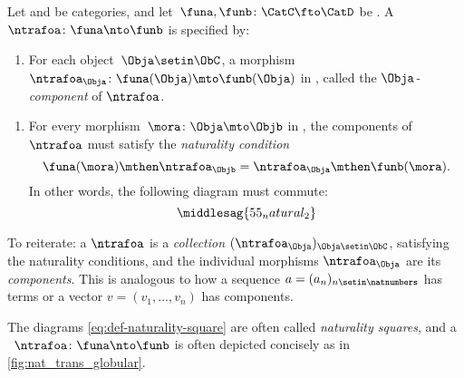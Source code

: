 \begin{ctdefinition}
    \label{def:natural-transformation}
    Let \CatC and \CatD be categories, and let~$\funa,\funb\colon \CatC\fto \CatD$ be .
    A ~$\ntrafoa \colon \funa \nto \funb$ is specified by:

    \constit
    \begin{enumerate}
        \item For each object~$\Obja\setin \ObC$, a morphism $\ntrafoa_\Obja \colon \funa(\Obja)\mto \funb(\Obja)$ in \CatD, called the $\Obja$\emph{-component} of $\ntrafoa$.
    \end{enumerate}
    \condit
    \begin{enumerate}
        \item For every morphism~$\mora\colon \Obja\mto \Objb$ in \CatC, the components of $\ntrafoa$ must satisfy the \emph{naturality condition}
              \begin{equation}
                  \funa(\mora)\mthen \ntrafoa_\Objb = \ntrafoa_\Obja\mthen \funb(\mora).
              \end{equation}
              In other words, the following diagram must commute:
              \begin{equation}
                  \label{eq:def-naturality-square}
                  \middlesag{55_natural_2}
              \end{equation}
    \end{enumerate}
\end{ctdefinition}

To reiterate: a  $\ntrafoa$ is a \emph{collection} $(\ntrafoa_\Obja)_{\Obja \setin \ObC}$, satisfying the naturality conditions, and the individual morphisms $\ntrafoa_\Obja$ are its \emph{components}.
This is analogous to how a sequence $a = (a_n)_{n \setin \natnumbers}$ has terms or a vector $v = (v_1, .
    .., v_n)$ has components.

The diagrams \cref{eq:def-naturality-square} are often called \emph{naturality squares}, and a ~$\ntrafoa \colon \funa\nto \funb$ is often depicted concisely as in \cref{fig:nat_trans_globular}.

\begin{marginfigure}
    \centering
    \caption{}
    \label{fig:nat_trans_globular}
\end{marginfigure}
\begin{figure}[h!]
    \centering
    \begin{ctdefinitionshade}
    \end{ctdefinitionshade}
    \caption{}
    \label{fig:nat_trans_graphically}
\end{figure}

